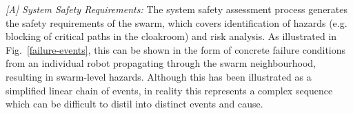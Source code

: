 \documentclass[runningheads]{llncs}
\begin{document}

\emph{[A] System Safety Requirements:}
The system safety assessment process generates the safety requirements of the swarm, which covers identification of hazards (e.g. blocking of critical paths in the cloakroom) and risk analysis. 
As illustrated in Fig.~\ref{failure-events}, this can be shown in the form of concrete failure conditions from an individual robot propagating through the swarm neighbourhood, resulting in swarm-level hazards. 
Although this has been illustrated as a simplified linear chain of events, in reality this represents a complex sequence which can be difficult to distil into distinct events and cause. 
\end{document}
